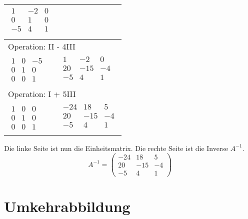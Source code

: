 \begin{longtable}{p{4cm}|p{3cm}}
    $\displaystyle\begin{matrix}
        1 & -2 & 0 \\
        0 & 1 & 0 \\
        -5 & 4 & 1 \\
    \end{matrix}$\\\hline
    \multicolumn{2}{p{\dimexpr4cm+3cm+2\tabcolsep\relax}}{Operation: II - 4III} \\\hline\pagebreak[0]
    $\displaystyle\begin{matrix}
        1 & 0 & -5 \\
        0 & 1 & 0 \\
        0 & 0 & 1
    \end{matrix}$&
    $\displaystyle\begin{matrix}
        1 & -2 & 0 \\
        20 & -15 & -4 \\
        -5 & 4 & 1 \\
    \end{matrix}$\\\hline
    \multicolumn{2}{p{\dimexpr4cm+3cm+2\tabcolsep\relax}}{Operation: I + 5III} \\\hline\pagebreak[0]
    $\displaystyle\begin{matrix}
        1 & 0 & 0 \\
        0 & 1 & 0 \\
        0 & 0 & 1
    \end{matrix}$&
    $\displaystyle\begin{matrix}
        -24 & 18 & 5 \\
        20 & -15 & -4 \\
        -5 & 4 & 1 \\
    \end{matrix}$\\\hline
\end{longtable}

Die linke Seite ist nun die Einheitsmatrix. Die rechte Seite ist die Inverse \(A^{-1}\).
\[ A^{-1} = \begin{pmatrix}
-24 & 18 & 5 \\
20 & -15 & -4 \\
-5 & 4 & 1
\end{pmatrix} \]

\section{Umkehrabbildung}

